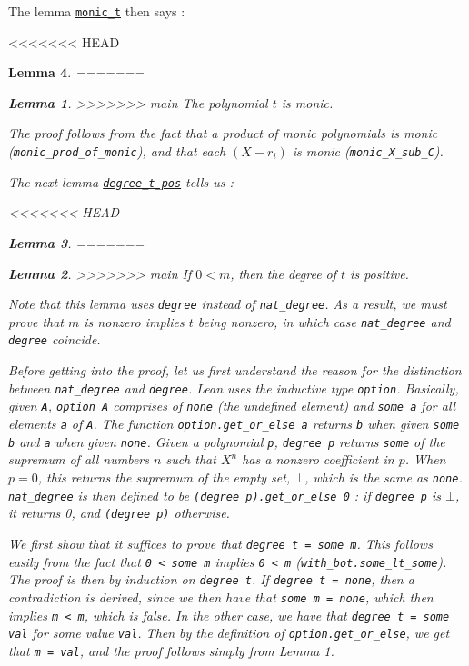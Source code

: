 \documentclass{article}
\newtheorem{lemma}{Lemma}
\theoremstyle{definition}
\theoremstyle{remark}
\begin{document}
The lemma \href{https://github.com/BoltonBailey/formal-snarks-project/blob/7fd9cd122f5887f88f6a706b4f2a68a7153c7381/src/snarks/babysnark/knowledge_soundness.lean#L82}{\texttt{monic\_t}} then says :
\theoremstyle{lemma}
<<<<<<< HEAD
\begin{lemma} \label{monic_t}
=======
\begin{lemma}
>>>>>>> main
  The polynomial $t$ is monic.
\end{lemma}
The proof follows from the fact that a product of monic polynomials is monic (\texttt{monic\_prod\_of\_monic}), and that each $(X - r_i)$ is monic (\texttt{monic\_X\_sub\_C}).

The next lemma \href{https://github.com/BoltonBailey/formal-snarks-project/blob/7fd9cd122f5887f88f6a706b4f2a68a7153c7381/src/snarks/babysnark/knowledge_soundness.lean#L91}{\texttt{degree\_t\_pos}} tells us :
\theoremstyle{lemma}
<<<<<<< HEAD
\begin{lemma} \label{t_pos}
=======
\begin{lemma}
>>>>>>> main
  If $0 < m$, then the degree of $t$ is positive.
\end{lemma}
Note that this lemma uses \texttt{degree} instead of \texttt{nat\_degree}. As a result, we must prove that $m$ is nonzero implies $t$ being nonzero, in which case \texttt{nat\_degree} and \texttt{degree} coincide. 

Before getting into the proof, let us first understand the reason for the distinction between \texttt{nat\_degree} and \texttt{degree}. Lean uses the inductive type \texttt{option}. Basically, given \texttt{A}, 
\texttt{option A} comprises of \texttt{none} (the undefined element) and \texttt{some a} for all elements \texttt{a} of \texttt{A}. The function \texttt{option.get\_or\_else a} returns \texttt{b} when given 
\texttt{some b} and \texttt{a} when given \texttt{none}. Given a polynomial \texttt{p}, \texttt{degree p} returns \texttt{some} of the supremum of all numbers $n$ such that $X^n$ has 
a nonzero coefficient in $p$. When $p = 0$, this returns the supremum of the empty set, $\bot$, which is the same as \texttt{none}. \texttt{nat\_degree} is then defined to be \texttt{(degree p).get\_or\_else 0} : 
if \texttt{degree p} is $\bot$, it returns 0, and \texttt{(degree p)} otherwise.

We first show that it suffices to prove that \texttt{degree t = some m}. This follows easily from the fact that \texttt{0 < some m} implies \texttt{0 < m} (\texttt{with\_bot.some\_lt\_some}).
The proof is then by induction on \texttt{degree t}. 
If \texttt{degree t = none}, then a contradiction is derived, since we then have that \texttt{some m = none}, which then implies \texttt{m < m}, which is false. In the other case, we have that \texttt{degree t = some val} 
for some value \texttt{val}. Then by the definition of \texttt{option.get\_or\_else}, we get that \texttt{m = val}, and the proof follows simply from Lemma 1.


\end{lemma}
\end{lemma}
\end{document}
